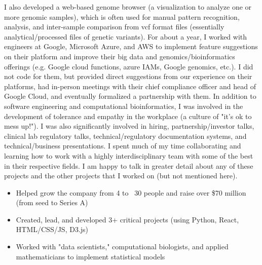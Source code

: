 \documentclass[a4paper, 10pt]{article}
\begin{document}
\indent I also developed a web-based genome browser (a visualization to analyze one or more genomic samples), which is often used for manual pattern recognition, analysis, and inter-sample comparison from vcf format files (essentially analytical/processed files of genetic variants).  For about a year, I worked with engineers at Google, Microsoft Azure, and AWS to implement feature suggestions on their platform and improve their big data and genomics/bioinformatics offerings (e.g. Google cloud functions, azure IAMs, Google genomics, etc.).  I did not code for them, but provided direct suggestions from our experience on their platforms, had in-person meetings with their chief compliance officer and head of Google Cloud, and eventually formalized a partnership with them.  In addition to software engineering and computational bioinformatics, I was involved in the development of tolerance and empathy in the workplace (a culture of "it's ok to mess up!").  I was also significantly involved in hiring, partnership/investor talks, clinical lab regulatory talks, technical/regulatory documentation systems, and technical/business presentations.  I spent much of my time collaborating and learning how to work with a highly interdisciplinary team with some of the best in their respective fields.  I am happy to talk in greater detail about any of these projects and the other projects that I worked on (but not mentioned here).\\[-6mm]
\begin{itemize}[leftmargin=5mm] 
\itemsep -2pt
	\item Helped grow the company from 4 to ~30 people and raise over \$70 million (from seed to Series A)
	\item Created, lead, and developed 3+ critical projects (using Python, React, HTML/CSS/JS, D3.js)
	\item Worked with "data scientists," computational biologists, and applied mathematicians to implement statistical models
\end{itemize}
                 
\end{document}
